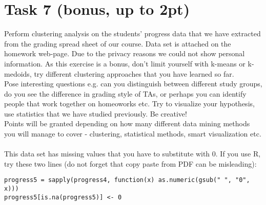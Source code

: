 \documentclass{article}
\begin{document}
\section*{Task 7 (bonus, up to 2pt)}
Perform clustering analysis on the students' progress data that we have extracted from the grading spread sheet of our course. Data set is attached on the homework web-page. Due to the privacy reasons we could not show personal information. As this exercise is a bonus, don't limit yourself with k-means or k-medoids, try different clustering approaches that you have learned so far. \\
Pose interesting questions e.g. can you distinguish between different study groups, do you see the difference in grading style of TAs, or perhaps you can identify people that work together on homeoworks etc. Try to visualize your hypothesis, use statistics that we have studied previously. Be creative!\\
Points will be granted depending on how many different data mining methods you will manage to cover - clustering, statistical methods, smart visualization etc.\\\\
This data set has missing values that you have to substitute with 0. If you use R, try these two lines (do not forget that copy paste from PDF can be misleading):
\begin{lstlisting}
progress5 = sapply(progress4, function(x) as.numeric(gsub(" ", "0", x))) 
progress5[is.na(progress5)] <- 0
\end{lstlisting}
\end{document}
